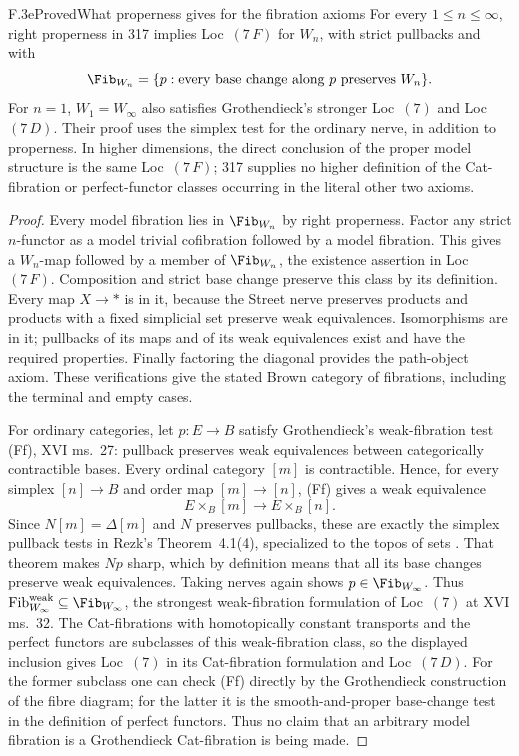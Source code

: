 \begin{claim}{F.3e}{Proved}{What properness gives for the fibration axioms}
For every $1\leq n\leq\infty$, right properness in 317 implies
Loc~$(7\,F)$ for $W_n$, with strict pullbacks and with
\[
 \Fib_{W_n}=
 \{p:\text{every base change along }p\text{ preserves }W_n\}.
\]
For $n=1$, $W_1=W_\infty$ also satisfies Grothendieck's stronger
Loc~$(7)$ and Loc~$(7\,D)$. Their proof uses the simplex test for
the ordinary nerve, in addition to properness. In higher dimensions,
the direct conclusion of the proper model structure is the same
Loc~$(7\,F)$; 317 supplies no higher definition of the Cat-fibration
or perfect-functor classes occurring in the literal other two axioms.
\end{claim}
\begin{proof}
Every model fibration lies in $\Fib_{W_n}$ by right properness.
Factor any strict $n$-functor as a model trivial cofibration
followed by a model fibration. This gives a $W_n$-map followed
by a member of $\Fib_{W_n}$, the existence assertion in
Loc~$(7\,F)$. Composition and strict base change preserve this
class by its definition. Every map $X\to *$ is in it, because
the Street nerve preserves products and products with a fixed
simplicial set preserve weak equivalences. Isomorphisms are in it;
pullbacks of its maps and of its weak equivalences exist and have
the required properties. Finally factoring the diagonal provides
the path-object axiom. These verifications give the stated Brown
category of fibrations, including the terminal and empty cases.

For ordinary categories, let $p:E\to B$ satisfy Grothendieck's
weak-fibration test (Ff), XVI ms.~27: pullback preserves weak
equivalences between categorically contractible bases. Every
ordinal category $[m]$ is contractible. Hence, for every simplex
$[n]\to B$ and order map $[m]\to[n]$, (Ff) gives a weak
equivalence
\[
 E\times_B[m]\longrightarrow E\times_B[n].
\]
Since $N[m]=\Delta[m]$ and $N$ preserves pullbacks, these are
exactly the simplex pullback tests in Rezk's Theorem~4.1(4),
specialized to the topos of sets \cite{I_Rezk1998}. That theorem
makes $Np$ sharp, which by definition means that all its base
changes preserve weak equivalences. Taking nerves again shows
$p\in\Fib_{W_\infty}$. Thus
$\mathrm{Fib}^{\mathrm{weak}}_{W_\infty}\subseteq
\Fib_{W_\infty}$, the strongest weak-fibration formulation of
Loc~$(7)$ at XVI ms.~32. The Cat-fibrations with homotopically
constant transports and the perfect functors are subclasses of
this weak-fibration class, so the displayed inclusion gives
Loc~$(7)$ in its Cat-fibration formulation and Loc~$(7\,D)$.
For the former subclass one can check (Ff) directly by the
Grothendieck construction of the fibre diagram; for the latter
it is the smooth-and-proper base-change test in the definition of
perfect functors. Thus no claim that an arbitrary model fibration
is a Grothendieck Cat-fibration is being made.


\end{proof}
